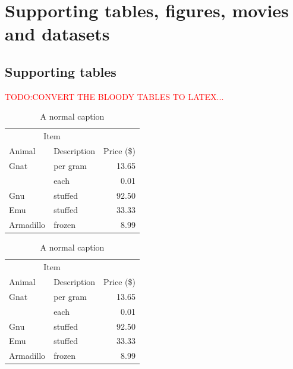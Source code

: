 \documentclass[11pt,a4paper, draft]{article}
\newcommand{\TODO}[1]{
\textcolor{red}{TODO:#1}
}
\begin{document}
\section{Supporting tables, figures, movies and datasets}
\subsection{Supporting tables}
\setcounter{table}{0}
\makeatletter 
\renewcommand{\thetable}{S\@arabic\c@figure}
\makeatother
%
\TODO{CONVERT THE BLOODY TABLES TO LATEX...}
\begin{table}[htbp]
\begin{tabular}{llr} \toprule \multicolumn{2}{c}{Item} \\ \cmidrule(r){1-2} Animal & Description & Price (\$) \\ \midrule Gnat & per gram & 13.65 \\ & each & 0.01 \\ Gnu & stuffed & 92.50 \\ Emu & stuffed & 33.33 \\ Armadillo & frozen & 8.99 \\ \bottomrule
\end{tabular}
 \caption{A normal caption} 
 \label{tab:metadata}
 \end{table}

\begin{table}[htbp]
\begin{tabular}{llr} \toprule \multicolumn{2}{c}{Item} \\ \cmidrule(r){1-2} Animal & Description & Price (\$) \\ \midrule Gnat & per gram & 13.65 \\ & each & 0.01 \\ Gnu & stuffed & 92.50 \\ Emu & stuffed & 33.33 \\ Armadillo & frozen & 8.99 \\ \bottomrule
\end{tabular}
 \caption{A normal caption} 
 \end{table}
\end{document}
